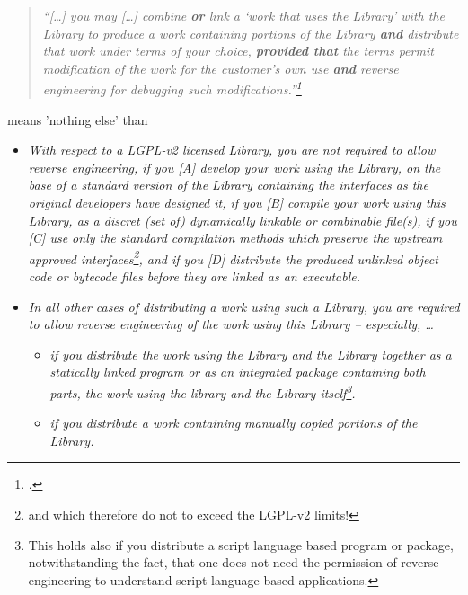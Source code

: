 \begin{quote}\noindent\emph{\enquote{[\ldots] you may [\ldots] combine
\textbf{or} link a \enquote{work that uses the Library} with the Library to
produce a work containing portions of the Library \textbf{and} distribute that
work under terms of your choice, \textbf{provided that} the terms permit
modification of the work for the customer's own use \textbf{and} \emph{reverse
engineering} for debugging such modifications.}\footcite[cf.][\nopage wp., §6, 
emphasis KR.]{Lgpl21OsiLicense1999a}}
\end{quote}

means 'nothing else' than

\begin{itemize}
  \item \emph{With respect to a LGPL-v2 licensed Library, you are not required
  to allow reverse engineering, if you [A] develop your work using the Library,
  on the base of a standard version of the Library containing the interfaces as
  the original developers have designed it, if you [B] compile your work using
  this Library, as a discret (set of) dynamically linkable or combinable
  file(s), if you [C] use only the standard compilation methods which preserve
  the upstream approved interfaces\footnote{and which therefore do not to exceed
  the LGPL-v2 limits!}, and if you [D] distribute the produced unlinked object
  code or bytecode files before they are linked as an executable.}
  \item \emph{In all other cases of distributing a work using such a Library,
  you are required to allow reverse engineering of the work using this Library
  -- especially, \ldots}
  \begin{itemize}
    \item \emph{if you distribute the work using the Library and the Library
    together as a statically linked program or as an integrated package
    containing both parts, the work using the library and the Library
    itself\footnote{This holds also if you distribute a script language based
    program or package, notwithstanding the fact, that one does not need the
    permission of reverse engineering to understand script language based
    applications.}.}
    \item \emph{if you distribute a work containing manually copied portions of
    the Library.}
  \end{itemize}
\end{itemize}


